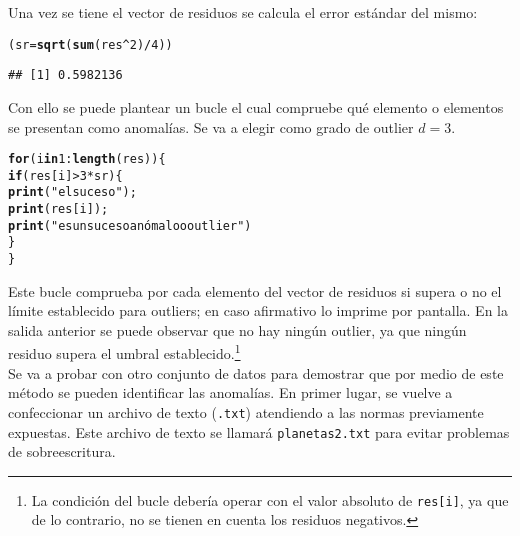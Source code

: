 \documentclass[12pt]{report}\usepackage[]{graphicx}\usepackage[dvipsnames]{xcolor}
\makeatletter
\newcommand{\hlnum}[1]{\textcolor[rgb]{0.686,0.059,0.569}{#1}}%
\newcommand{\hlstr}[1]{\textcolor[rgb]{0.192,0.494,0.8}{#1}}%
\newcommand{\hlopt}[1]{\textcolor[rgb]{0,0,0}{#1}}%
\newcommand{\hlstd}[1]{\textcolor[rgb]{0.345,0.345,0.345}{#1}}%
\newcommand{\hlkwa}[1]{\textcolor[rgb]{0.161,0.373,0.58}{\textbf{#1}}}%
\newcommand{\hlkwb}[1]{\textcolor[rgb]{0.69,0.353,0.396}{#1}}%
\newcommand{\hlkwd}[1]{\textcolor[rgb]{0.737,0.353,0.396}{\textbf{#1}}}%
\newenvironment{kframe}{%
 \def\at@end@of@kframe{}%
 \ifinner\ifhmode%
  \def\at@end@of@kframe{\end{minipage}}%
  \begin{minipage}{\columnwidth}%
 \fi\fi%
 \def\FrameCommand##1{\hskip\@totalleftmargin \hskip-\fboxsep
 \colorbox{shadecolor}{##1}\hskip-\fboxsep
     \hskip-\linewidth \hskip-\@totalleftmargin \hskip\columnwidth}%
 \MakeFramed {\advance\hsize-\width
   \@totalleftmargin\z@ \linewidth\hsize
   \@setminipage}}%
 {\par\unskip\endMakeFramed%
 \at@end@of@kframe}
\newenvironment{knitrout}{}{} %
\makeatother
\begin{document}
			 Una vez se tiene el vector de residuos se calcula el error estándar del mismo:
			 
\begin{knitrout}
\color{fgcolor}\begin{kframe}
\begin{alltt}
\hlstd{(sr} \hlkwb{=} \hlkwd{sqrt}\hlstd{(}\hlkwd{sum}\hlstd{(res}\hlopt{^}\hlnum{2}\hlstd{)}\hlopt{/}\hlnum{4}\hlstd{))}
\end{alltt}
\begin{verbatim}
## [1] 0.5982136
\end{verbatim}
\end{kframe}
\end{knitrout}
			 
			 Con ello se puede plantear un bucle el cual compruebe qué elemento o elementos se presentan como anomalías. Se va a elegir como grado de outlier $d = 3$. 
			 
\begin{knitrout}
\color{fgcolor}\begin{kframe}
\begin{alltt}
\hlkwa{for} \hlstd{(i} \hlkwa{in} \hlnum{1}\hlopt{:}\hlkwd{length}\hlstd{(res)) \{}
        \hlkwa{if} \hlstd{(res[i]} \hlopt{>} \hlnum{3}\hlopt{*}\hlstd{sr) \{}
                \hlkwd{print}\hlstd{(}\hlstr{"el suceso"}\hlstd{);}
                \hlkwd{print}\hlstd{(res[i]);}
                \hlkwd{print}\hlstd{(}\hlstr{"es un suceso anómalo o outlier"}\hlstd{)}
        \hlstd{\}}
\hlstd{\}}
\end{alltt}
\end{kframe}
\end{knitrout}
			 
			 Este bucle comprueba por cada elemento del vector de residuos si supera o no el límite establecido para outliers; en caso afirmativo lo imprime por pantalla. En la salida anterior se puede observar que no hay ningún outlier, ya que ningún residuo supera el umbral establecido.\footnote{La condición del bucle debería operar con el valor absoluto de \texttt{res[i]}, ya que de lo contrario, no se tienen en cuenta los residuos negativos. }\\ 
			 
			 Se va a probar con otro conjunto de datos para demostrar que por medio de este método se pueden identificar las anomalías. En primer lugar, se vuelve a confeccionar un archivo de texto (\texttt{.txt}) atendiendo a las normas previamente expuestas. Este archivo de texto se llamará \texttt{planetas2.txt} para evitar problemas de sobreescritura. 
			
\end{document}
